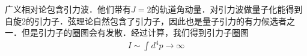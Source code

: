  
 广义相对论包含引力波．他们带有$J = 2$的轨道角动量．对引力波做量子化能得到自旋2的引力子．弦理论自然包含了引力子，因此也是量子引力的有力候选者之一．但是引力子的圈图会有发散．经过计算，我们得到引力子圈图
 \begin{align}
 I \sim \int d^4 p \rightarrow \infty 
 \end{align}
 
